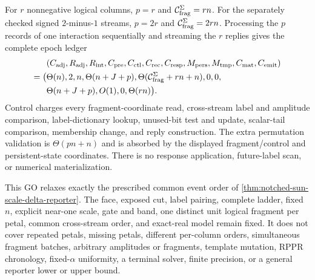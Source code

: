 \begin{theorem}
For $r$ nonnegative logical columns, $p=r$ and
$\mathcal C_{\rm frag}^{\Sigma}=rn$.  For the separately checked signed
$2$-minus-$1$ streams, $p=2r$ and
$\mathcal C_{\rm frag}^{\Sigma}=2rn$.  Processing the $p$ records of one
interaction sequentially and streaming the $r$ replies gives the complete
epoch ledger
\begin{equation}
 \begin{aligned}
 &(C_{\rm adj},R_{\rm adj},R_{\rm int},C_{\rm pre},C_{\rm ctl},C_{\rm rec},
 C_{\rm resp},M_{\rm pers},M_{\rm tmp},C_{\rm mat},C_{\rm emit})\\
 =\bigl(&\Theta(n),2,n,\Theta(n+J+p),
 \Theta(\mathcal C_{\rm frag}^{\Sigma}+rn+n),0,0,\\
 &\Theta(n+J+p),O(1),0,\Theta(rn)\bigr).
 \end{aligned}
 \label{eq:notched-sun-permutation-eleven-vector}
\end{equation}
Control charges every fragment-coordinate read, cross-stream label and
amplitude comparison, label-dictionary lookup, unused-bit test and update,
scalar-tail comparison, membership change, and reply construction.  The
extra permutation validation is $\Theta(pn+n)$ and is absorbed by the
displayed fragment/control and persistent-state coordinates.  There is no
response application, future-label scan, or numerical materialization.

This GO relaxes exactly the prescribed common event order of
\cref{thm:notched-sun-scale-delta-reporter}.  The face, exposed cut, label
pairing, complete ladder, fixed $n$, explicit near-one scale, gate and band,
one distinct unit logical fragment per petal, common cross-stream order, and
exact-real model remain fixed.  It does not cover repeated petals, missing
petals, different per-column orders, simultaneous fragment batches,
arbitrary amplitudes or fragments, template mutation, RPPR chronology,
fixed-$\alpha$ uniformity, a terminal solver, finite precision, or a general
reporter lower or upper bound.
\end{theorem}

